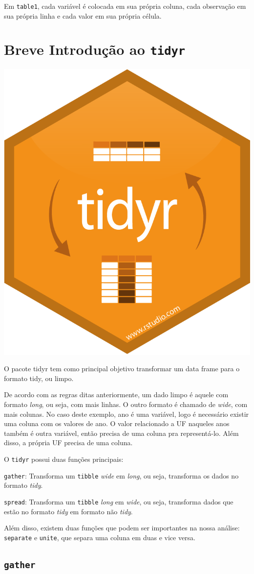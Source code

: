 \documentclass[]{book}
\begin{document}
Em \texttt{table1}, cada variável é colocada em sua própria coluna, cada observação em sua própria linha e cada valor em sua própria célula.

\hypertarget{breve-introduuxe7uxe3o-ao-tidyr}{%
\section{\texorpdfstring{Breve Introdução ao \texttt{tidyr}}{Breve Introdução ao tidyr}}\label{breve-introduuxe7uxe3o-ao-tidyr}}

\begin{center}\includegraphics[width=0.25\linewidth]{imagens/tidyr} \end{center}

O pacote tidyr tem como principal objetivo transformar um data frame para o formato tidy, ou limpo.

De acordo com as regras ditas anteriormente, um dado limpo é aquele com formato \emph{long}, ou seja, com mais linhas. O outro formato é chamado de \emph{wide}, com mais colunas. No caso deste exemplo, ano é uma variável, logo é necessário existir uma coluna com os valores de ano. O valor relacionado a UF naqueles anos também é outra variável, então precisa de uma coluna pra representá-lo. Além disso, a própria UF precisa de uma coluna.

O \texttt{tidyr} possui duas funções principais:

\texttt{gather}: Transforma um \texttt{tibble} \emph{wide} em \emph{long}, ou seja, transforma os dados no formato \emph{tidy}.

\texttt{spread}: Transforma um \texttt{tibble} \emph{long} em \emph{wide}, ou seja, transforma dados que estão no formato \emph{tidy} em formato não \emph{tidy}.

Além disso, existem duas funções que podem ser importantes na nossa análise: \texttt{separate} e \texttt{unite}, que separa uma coluna em duas e vice versa.

\hypertarget{gather}{%
\subsection{\texorpdfstring{\texttt{gather}}{gather}}\label{gather}}
\end{document}
